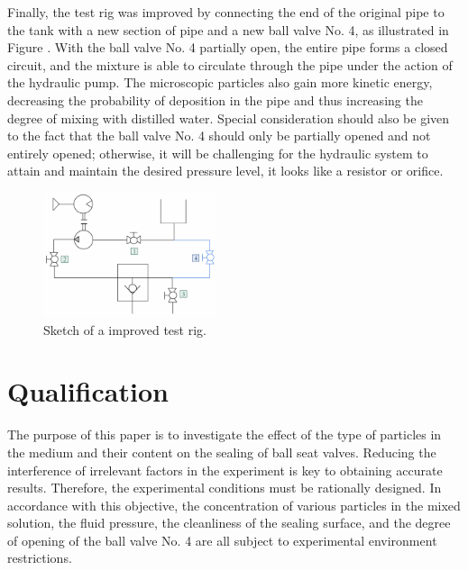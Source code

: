 Finally, the test rig was improved by connecting the end of the original pipe to the tank with a new section of
pipe and a new ball valve No. 4, as illustrated in Figure . With the ball valve No. 4 partially open, 
the entire pipe forms a closed circuit, and the mixture is able to circulate through the pipe under 
the action of the hydraulic pump. The microscopic particles also gain more kinetic energy, decreasing 
the probability of deposition in the pipe and thus increasing the degree of mixing with distilled water. 
Special consideration should also be given to the fact that the ball valve No. 4 should only be partially 
opened and not entirely opened; otherwise, it will be challenging for the hydraulic system 
to attain and maintain the desired pressure level, it looks like a resistor or orifice.

\begin{figure}[H]
    \centering
    \includegraphics[width=0.45\textwidth]{figures/TestRig/newTestRig.jpg}
    \caption{Sketch of a improved test rig.}
    \label{fig:newTestRig}
\end{figure}

\section{Qualification}
\label{Qualification}

The purpose of this paper is to investigate the effect of the type of particles 
in the medium and their content on the sealing of ball seat valves. Reducing the
 interference of irrelevant factors in the experiment is key to obtaining 
 accurate results. Therefore, the experimental conditions must be rationally 
 designed. In accordance with this objective, the concentration of various
 particles in the mixed solution, the fluid pressure, the cleanliness of the 
 sealing surface, and the degree of opening of the ball valve No. 4 are all
  subject to experimental environment restrictions. \\

